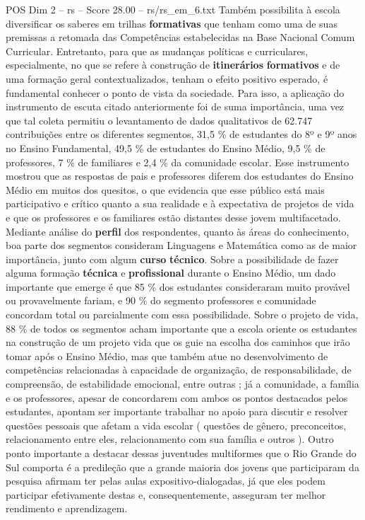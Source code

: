 \begin{textsample}{POS Dim 2 – rs – Score 28.00 – rs/rs\_em\_6.txt}
Também possibilita à escola diversificar os saberes em trilhas \textbf{formativas} que tenham como uma de suas premissas a retomada das Competências estabelecidas na Base Nacional Comum Curricular.
Entretanto, para que as mudanças políticas e curriculares, especialmente, no que se refere à construção de \textbf{itinerários} \textbf{formativos} e de uma formação geral contextualizados, tenham o efeito positivo esperado, é fundamental conhecer o ponto de vista da sociedade.
Para isso, a aplicação do instrumento de escuta citado anteriormente foi de suma importância, uma vez que tal coleta permitiu o levantamento de dados qualitativos de 62.747 contribuições entre os diferentes segmentos, 31,5 \% de estudantes do 8º e 9º anos no Ensino Fundamental, 49,5 \% de estudantes do Ensino Médio, 9,5 \% de professores, 7 \% de familiares e 2,4 \% da comunidade escolar.
Esse instrumento mostrou que as respostas de pais e professores diferem dos estudantes do Ensino Médio em muitos dos quesitos, o que evidencia que esse público está mais participativo e crítico quanto a sua realidade e à expectativa de projetos de vida e que os professores e os familiares estão distantes desse jovem multifacetado.
Mediante análise do \textbf{perfil} dos respondentes, quanto às áreas do conhecimento, boa parte dos segmentos consideram Linguagens e Matemática como as de maior importância, junto com algum \textbf{curso} \textbf{técnico}.
Sobre a possibilidade de fazer alguma formação \textbf{técnica} e \textbf{profissional} durante o Ensino Médio, um dado importante que emerge é que 85 \% dos estudantes consideraram muito provável ou provavelmente fariam, e 90 \% do segmento professores e comunidade concordam total ou parcialmente com essa possibilidade.
Sobre o projeto de vida, 88 \% de todos os segmentos acham importante que a escola oriente os estudantes na construção de um projeto vida que os guie na escolha dos caminhos que irão tomar após o Ensino Médio, mas que também atue no desenvolvimento de competências relacionadas à capacidade de organização, de responsabilidade, de compreensão, de estabilidade emocional, entre outras ; já a comunidade, a família e os professores, apesar de concordarem com ambos os pontos destacados pelos estudantes, apontam ser importante trabalhar no apoio para discutir e resolver questões pessoais que afetam a vida escolar ( questões de gênero, preconceitos, relacionamento entre eles, relacionamento com sua família e outros ).
Outro ponto importante a destacar dessas juventudes multiformes que o Rio Grande do Sul comporta é a predileção que a grande maioria dos jovens que participaram da pesquisa afirmam ter pelas aulas expositivo-dialogadas, já que eles podem participar efetivamente destas e, consequentemente, asseguram ter melhor rendimento e aprendizagem.

\end{textsample}
